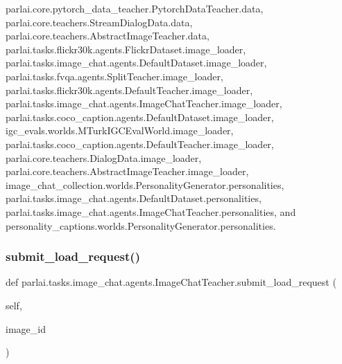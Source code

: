 parlai.\+core.\+pytorch\+\_\+data\+\_\+teacher.\+Pytorch\+Data\+Teacher.\+data, parlai.\+core.\+teachers.\+Stream\+Dialog\+Data.\+data, parlai.\+core.\+teachers.\+Abstract\+Image\+Teacher.\+data, parlai.\+tasks.\+flickr30k.\+agents.\+Flickr\+Dataset.\+image\+\_\+loader, parlai.\+tasks.\+image\+\_\+chat.\+agents.\+Default\+Dataset.\+image\+\_\+loader, parlai.\+tasks.\+fvqa.\+agents.\+Split\+Teacher.\+image\+\_\+loader, parlai.\+tasks.\+flickr30k.\+agents.\+Default\+Teacher.\+image\+\_\+loader, parlai.\+tasks.\+image\+\_\+chat.\+agents.\+Image\+Chat\+Teacher.\+image\+\_\+loader, parlai.\+tasks.\+coco\+\_\+caption.\+agents.\+Default\+Dataset.\+image\+\_\+loader, igc\+\_\+evals.\+worlds.\+M\+Turk\+I\+G\+C\+Eval\+World.\+image\+\_\+loader, parlai.\+tasks.\+coco\+\_\+caption.\+agents.\+Default\+Teacher.\+image\+\_\+loader, parlai.\+core.\+teachers.\+Dialog\+Data.\+image\+\_\+loader, parlai.\+core.\+teachers.\+Abstract\+Image\+Teacher.\+image\+\_\+loader, image\+\_\+chat\+\_\+collection.\+worlds.\+Personality\+Generator.\+personalities, parlai.\+tasks.\+image\+\_\+chat.\+agents.\+Default\+Dataset.\+personalities, parlai.\+tasks.\+image\+\_\+chat.\+agents.\+Image\+Chat\+Teacher.\+personalities, and personality\+\_\+captions.\+worlds.\+Personality\+Generator.\+personalities.

\mbox{\label{classparlai_1_1tasks_1_1image__chat_1_1agents_1_1ImageChatTeacher_a6028198a57fccc50c4c7f4f294ed1f33}} 
\subsubsection{\texorpdfstring{submit\+\_\+load\+\_\+request()}{submit\_load\_request()}}
{\footnotesize\ttfamily def parlai.\+tasks.\+image\+\_\+chat.\+agents.\+Image\+Chat\+Teacher.\+submit\+\_\+load\+\_\+request (\begin{DoxyParamCaption}\item[{}]{self,  }\item[{}]{image\+\_\+id }\end{DoxyParamCaption})}



